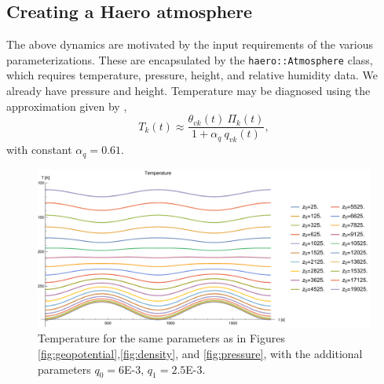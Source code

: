 
\subsection{Creating a Haero atmosphere}

The above dynamics are motivated by the input requirements of the various parameterizations.  
These are encapsulated by the \texttt{haero::Atmosphere} class, which requires temperature, pressure, height, and relative humidity data. 
We already have pressure and height.
Temperature may be diagnosed using the approximation given by \cite[eq.~(2.3)]{KlempWilhelmson1978},
\begin{equation}
  T_k(t) \approx \frac{\theta_{vk}(t) ~ \Pi_k(t)}{1+\alpha_q ~ q_{vk}(t)},
\end{equation}
with constant $\alpha_q = 0.61$.

\begin{figure}[H]
  \centering
  \includegraphics[width=\linewidth]{figures/temperature_plot}
  \caption{Temperature for the same parameters as in Figures \ref{fig:geopotential},\ref{fig:density}, and \ref{fig:pressure}, with the additional parameters $q_{0}=6$E-3, $q_1=2.5$E-3.}\label{fig:temperature}
\end{figure}

